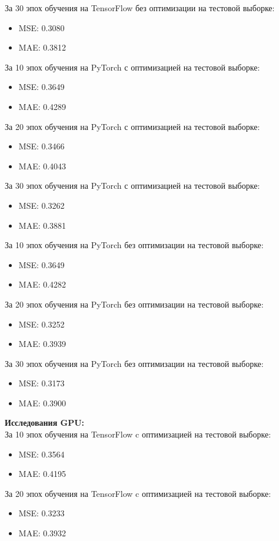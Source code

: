 \documentclass[a4paper,12pt,titlepage,final]{article}
\begin{document}
За 30 эпох обучения на TensorFlow без оптимизации на тестовой выборке:
\begin{itemize}
    \item MSE: 0.3080
    \item MAE: 0.3812
\end{itemize}
За 10 эпох обучения на PyTorch с оптимизацией на тестовой выборке:
\begin{itemize}
    \item MSE: 0.3649
    \item MAE: 0.4289
\end{itemize}
За 20 эпох обучения на PyTorch с оптимизацией на тестовой выборке:
\begin{itemize}
    \item MSE: 0.3466
    \item MAE: 0.4043
\end{itemize}
За 30 эпох обучения на PyTorch с оптимизацией на тестовой выборке:
\begin{itemize}
    \item MSE: 0.3262
    \item MAE: 0.3881
\end{itemize}
За 10 эпох обучения на PyTorch без оптимизации на тестовой выборке:
\begin{itemize}
    \item MSE: 0.3649
    \item MAE: 0.4282
\end{itemize}
За 20 эпох обучения на PyTorch без оптимизации на тестовой выборке:
\begin{itemize}
    \item MSE: 0.3252
    \item MAE: 0.3939
\end{itemize}
За 30 эпох обучения на PyTorch без оптимизации на тестовой выборке:
\begin{itemize}
    \item MSE: 0.3173
    \item MAE: 0.3900
\end{itemize}
\textbf{Исследования GPU:}
\\За 10 эпох обучения на TensorFlow c оптимизацией на тестовой выборке:
\begin{itemize}
    \item MSE: 0.3564
    \item MAE: 0.4195
\end{itemize}
За 20 эпох обучения на TensorFlow c оптимизацией на тестовой выборке:
\begin{itemize}
    \item MSE: 0.3233
    \item MAE: 0.3932
\end{itemize}
\end{document}

